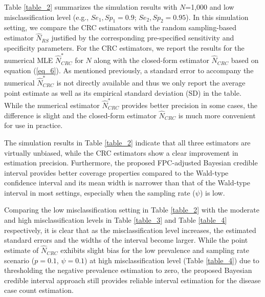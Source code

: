 \documentclass[useAMS,usenatbib,referee]{biom}
\begin{document}
Table \ref{table_2} summarizes the simulation results with $N$=1,000 and low misclassification level (e.g., $Se_1,Sp_1=0.9$; $Se_2,Sp_2=0.95$). In this simulation setting, we compare the CRC estimators with the random sampling-based estimator $\hat{N}_{RS}$ justified by the corresponding pre-specified sensitivity and specificity parameters. For the CRC estimators, we report the results for the numerical MLE $\hat{N}_{CRC}^*$ for $N$ along with the closed-form estimator $\hat{N}_{CRC}$ based on equation (\ref{eq_6}). As mentioned previously, a standard error to accompany the numerical $\hat{N}_{CRC}^*$ is not directly available and thus we only report the average point estimate as well as its empirical standard deviation (SD) in the table. While the numerical estimator $\hat{N}_{CRC}^*$ provides better precision in some cases, the difference is slight and the closed-form estimator $\hat{N}_{CRC}$ is much more convenient for use in practice.

The simulation results in Table \ref{table_2} indicate that all three estimators are virtually unbiased, while the CRC estimators show a clear improvement in estimation precision. Furthermore, the proposed FPC-adjusted Bayesian credible interval provides better coverage properties compared to the Wald-type confidence interval and its mean width is narrower than that of the Wald-type interval in most settings, especially when the sampling rate  ($\psi$) is low.

Comparing the low misclassification setting in Table \ref{table_2} with the moderate and high misclassification levels in Table \ref{table_3} and Table \ref{table_4} respectively, it is clear that as the misclassification level increases, the estimated standard errors and the widths of the interval become larger. While the point estimate of $\hat{N}_{CRC}$ exhibits slight bias for the low prevalence and sampling rate scenario ($p=0.1$, $\psi=0.1$) at high misclassification level (Table \ref{table_4}) due to thresholding the negative prevalence estimation to zero, the proposed Bayesian credible interval approach still provides reliable interval estimation for the disease case count estimation. 
\end{document}
